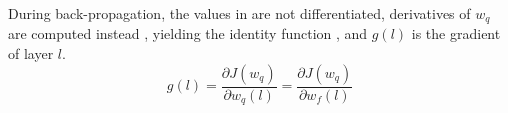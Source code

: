During back-propagation, the values in  are not differentiated, derivatives of $w_q$ are computed instead \citep{zhou2016dorefa,TWNs,gysel2016hardware}, yielding the identity function , and $g(l)$ is the gradient of layer $l$.
\begin{equation}
    \label{eqn:gradient}
    g(l)=\frac{\partial J(w_q)}{\partial w_q(l)}=\frac{\partial J(w_q)}{\partial w_f(l)}
\end{equation}

